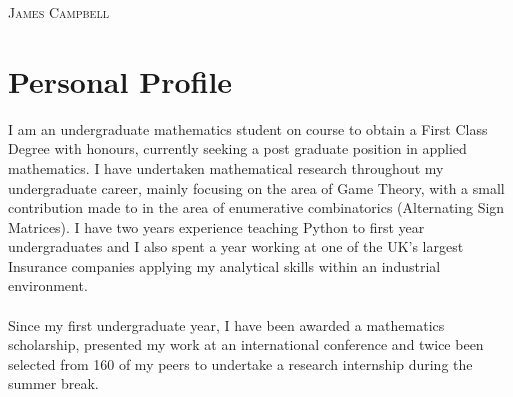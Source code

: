 \documentclass[a4paper]{article}
\begin{document}
\pagestyle{empty} %
\begin{multicols}{2}

\raggedright{\textsc{\Huge{James Campbell}}}\\
\columnbreak
{}

\end{multicols}

\section{Personal Profile}
I am an undergraduate mathematics student on course to obtain a First Class Degree with honours, currently seeking a post graduate position in applied mathematics.
I have undertaken mathematical research throughout my undergraduate career, mainly focusing on the area of Game Theory, with a small contribution made to in the area of enumerative combinatorics (Alternating Sign Matrices).
I have two years experience teaching Python to first year undergraduates and I also spent a year working at one of the UK's largest Insurance companies applying my analytical skills within an industrial environment.\\
\\
Since my first undergraduate year, I have been awarded a mathematics scholarship, presented my work at an international conference and twice been selected from 160 of my peers to undertake a research internship during the summer break.

\end{document}
